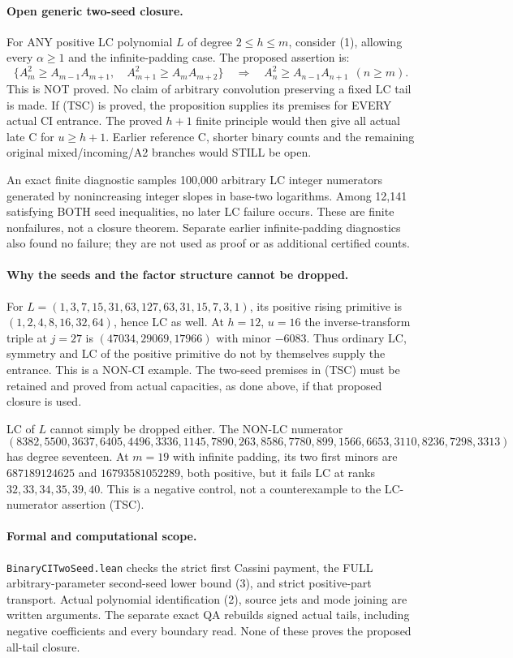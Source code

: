 \paragraph{Open generic two-seed closure.}
For ANY positive LC polynomial $L$ of degree $2\le h\le m$,
consider (1), allowing every $\alpha\ge1$ and the infinite-padding
case. The proposed assertion is:
\[
 \{A_m^2\ge A_{m-1}A_{m+1},\quad
   A_{m+1}^2\ge A_mA_{m+2}\}
 \quad\Longrightarrow\quad
 A_n^2\ge A_{n-1}A_{n+1}\ \ (n\ge m).                  \tag{TSC}
\]
This is NOT proved. No claim of arbitrary convolution preserving
a fixed LC tail is made. If (TSC) is proved, the proposition supplies
its premises for EVERY actual CI entrance. The proved $h+1$ finite
principle would then give all actual late C for $u\ge h+1$.
Earlier reference C, shorter binary counts and the remaining
original mixed/incoming/A2 branches would STILL be open.

An exact finite diagnostic samples 100,000 arbitrary LC integer
numerators generated by nonincreasing integer slopes in base-two
logarithms. Among 12,141 satisfying BOTH seed inequalities, no later
LC failure occurs. These are finite nonfailures, not a closure theorem.
Separate earlier infinite-padding diagnostics also found no failure;
they are not used as proof or as additional certified counts.

\paragraph{Why the seeds and the factor structure cannot be dropped.}
For $L=(1,3,7,15,31,63,127,63,31,15,7,3,1)$, its positive
rising primitive is $(1,2,4,8,16,32,64)$, hence LC as well.
At $h=12$, $u=16$ the inverse-transform triple at $j=27$ is
$(47034,29069,17966)$ with minor $-6083$.
Thus ordinary LC, symmetry and LC of the positive primitive do
not by themselves supply the entrance. This is a NON-CI example.
The two-seed premises in (TSC) must be retained and proved from
actual capacities, as done above, if that proposed closure is used.

LC of $L$ cannot simply be dropped either. The NON-LC numerator
\[
 (8382,5500,3637,6405,4496,3336,1145,7890,263,
 8586,7780,899,1566,6653,3110,8236,7298,3313)
\]
has degree seventeen. At $m=19$ with infinite padding, its two
first minors are $687189124625$ and $16793581052289$, both positive,
but it fails LC at ranks $32,33,34,35,39,40$. This is a negative
control, not a counterexample to the LC-numerator assertion (TSC).

\paragraph{Formal and computational scope.}
\texttt{BinaryCITwoSeed.lean} checks the strict first Cassini payment,
the FULL arbitrary-parameter second-seed lower bound (3), and strict
positive-part transport. Actual polynomial identification (2), source
jets and mode joining are written arguments. The separate exact QA
rebuilds signed actual tails, including negative coefficients and every
boundary read. None of these proves the proposed all-tail closure.
